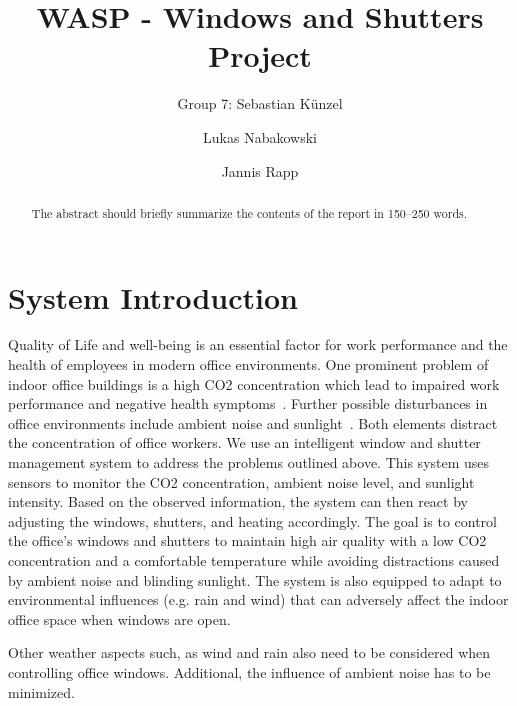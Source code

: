 \documentclass[runningheads]{llncs}
\begin{document}
%
\title{WASP - Windows and Shutters Project}

\author{Group 7: Sebastian Künzel \and
Lukas Nabakowski \and
Jannis Rapp}

%
\maketitle              %
%
\begin{abstract}
The abstract should briefly summarize the contents of the report in
150--250 words. 

\end{abstract}
%
%
%
\section{System Introduction}



Quality of Life and well-being is an essential factor for work performance and the health of employees in modern office environments. One prominent problem of indoor office buildings is a high CO2 concentration which lead to impaired work performance and negative health symptoms~\cite{indoor_polutionCO2}. Further possible disturbances in office environments include ambient noise and sunlight~\cite{indoor_noiselight}. Both elements distract the concentration of office workers. 
\newline
We use an intelligent window and shutter management system to address the problems outlined above.
This system uses sensors to monitor the CO2 concentration, ambient noise level, and sunlight intensity.
Based on the observed information, the system can then react by adjusting the windows, shutters, and heating accordingly.
\newline
The goal is to control the office's windows and shutters to maintain high air quality with a low CO2 concentration and a comfortable temperature while avoiding distractions caused by ambient noise and blinding sunlight. The system is also equipped to adapt to environmental influences (e.g. rain and wind) that can adversely affect the indoor office space when windows are open.   




Other weather aspects such, as wind and rain also need to be considered when controlling office windows. Additional, the influence of ambient noise has to be minimized. 
\end{document}
